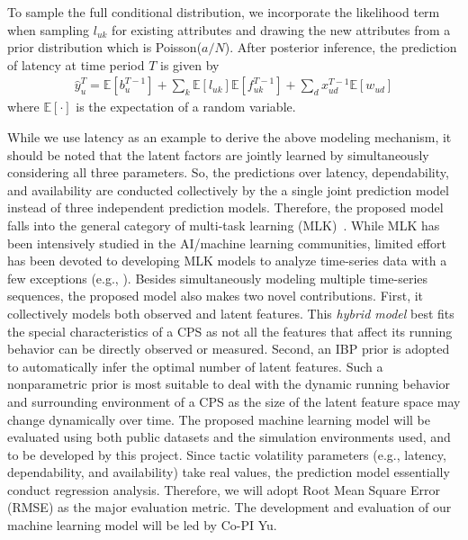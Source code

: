\documentclass[11pt]{proposalnsf}
\newlength\q %
\begin{document}
\begin{sloppypar}
To sample the full conditional distribution, we incorporate the likelihood term when sampling $l_{uk}$ for existing attributes and drawing the new attributes from a prior distribution which is Poisson($a/N$). After posterior inference, the prediction of latency at time period $T$ is given by
\begin{align}
\hat{y}^T_{u} = \mathbb{E}[b^{T-1}_u]+ \sum_k\mathbb{E}[l_{uk}]\mathbb{E}[f_{uk}^{T-1}] + \sum_d x_{ud}^{T-1}\mathbb{E}[w_{ud}]
\end{align}
where $\mathbb{E}[\cdot]$ is the expectation of a random variable. 

While we use latency as an example to derive the above modeling mechanism, it should be noted that the latent factors are jointly learned by simultaneously considering all three parameters. So, the predictions over latency, dependability, and availability are conducted collectively by the a single joint prediction model instead of three independent prediction models. Therefore, the proposed model falls into the general category of multi-task learning (MLK)~\cite{zhang2017survey}. While MLK has been intensively studied in the AI/machine learning communities, limited effort has been devoted to developing MLK models to analyze time-series data with a few exceptions (e.g., \cite{wang2012high}). Besides simultaneously modeling multiple time-series sequences, the proposed model also makes two novel contributions. First, it collectively models both observed and latent features. This {\em hybrid model} best fits the special characteristics of a CPS as not all the features that affect its running behavior can be directly observed or measured. Second, an IBP prior is adopted to automatically infer the optimal number of latent features. Such a nonparametric prior is most suitable to deal with the dynamic running behavior and surrounding environment of a CPS as the size of the latent feature space may change dynamically over time. The proposed machine learning model will be evaluated using both public datasets and the simulation environments used, and to be developed by this project. Since tactic volatility parameters (e.g., latency, dependability, and availability) take real values, the prediction model essentially conduct regression analysis. Therefore, we will adopt Root Mean Square Error (RMSE) as the major evaluation metric. The development and evaluation of our machine learning model will be led by Co-PI Yu.






\end{sloppypar}
\end{document}
